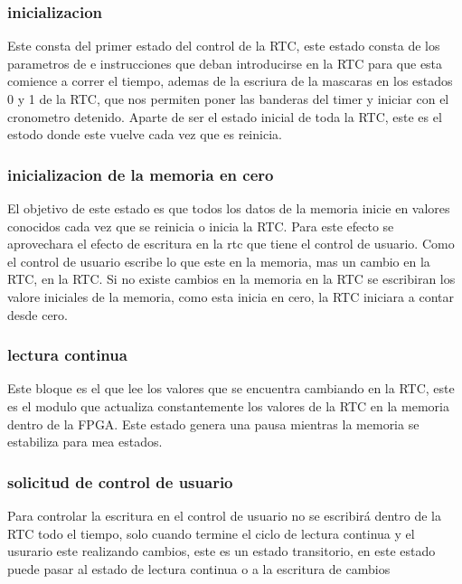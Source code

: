 \documentclass[12pt,a4paper]{article}
\begin{document}
		\subsubsection{inicializacion}
		
		Este consta del primer estado del control de la RTC, este estado consta de los parametros de e instrucciones que deban introducirse en la RTC para que esta comience a correr el tiempo, ademas de la escriura de la mascaras en los estados 0 y 1 de la RTC, que nos permiten poner las banderas del timer y iniciar con el cronometro detenido.
		Aparte de ser el estado inicial de toda la RTC, este es el estodo donde este vuelve cada vez que es reinicia.
		
		\subsubsection{inicializacion de la memoria en cero}
		
		El objetivo de este estado es que todos los datos de la memoria inicie en valores conocidos cada vez que se reinicia o inicia la RTC. Para este efecto se aprovechara el efecto de escritura en la rtc que tiene el control de usuario. 
		Como el control de usuario escribe lo que este en la memoria, mas un cambio en la RTC, en la RTC. Si no existe cambios en la memoria en la RTC se escribiran los valore iniciales de la memoria, como esta inicia en cero, la RTC iniciara a contar desde cero.
		
		\subsubsection{lectura continua}
		
		 Este bloque es el que lee los valores que se encuentra cambiando en la RTC, este es el modulo que actualiza constantemente los valores de la RTC en la memoria dentro de la FPGA.
		 Este estado genera una pausa mientras la memoria se estabiliza para mea estados. 
		
		\subsubsection{solicitud de control de usuario}
		
		Para controlar la escritura en el control de usuario no se escribirá dentro de la RTC todo el tiempo, solo cuando termine el ciclo de lectura continua y el usurario este realizando cambios, este es un estado transitorio, en este estado puede pasar al estado de lectura continua o a la escritura de cambios
		
\end{document}
